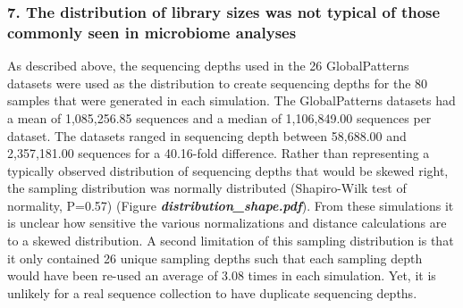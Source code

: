 \documentclass[
]{article}
\begin{document}
\hypertarget{the-distribution-of-library-sizes-was-not-typical-of-those-commonly-seen-in-microbiome-analyses}{%
\subsubsection{7. The distribution of library sizes was not typical of
those commonly seen in microbiome
analyses}\label{the-distribution-of-library-sizes-was-not-typical-of-those-commonly-seen-in-microbiome-analyses}}

As described above, the sequencing depths used in the 26 GlobalPatterns
datasets were used as the distribution to create sequencing depths for
the 80 samples that were generated in each simulation. The
GlobalPatterns datasets had a mean of 1,085,256.85 sequences and a
median of 1,106,849.00 sequences per dataset. The datasets ranged in
sequencing depth between 58,688.00 and 2,357,181.00 sequences for a
40.16-fold difference. Rather than representing a typically observed
distribution of sequencing depths that would be skewed right, the
sampling distribution was normally distributed (Shapiro-Wilk test of
normality, P=0.57) (Figure \textbf{\emph{distribution\_shape.pdf}}).
From these simulations it is unclear how sensitive the various
normalizations and distance calculations are to a skewed distribution. A
second limitation of this sampling distribution is that it only
contained 26 unique sampling depths such that each sampling depth would
have been re-used an average of 3.08 times in each simulation. Yet, it
is unlikely for a real sequence collection to have duplicate sequencing
depths.
\end{document}
